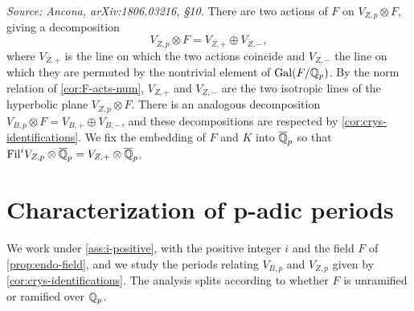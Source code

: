 \begin{remark}
  \label{rem:conventionF}
  \textit{Source: Ancona, arXiv:1806.03216, \S10.}
  There are two actions of \(F\) on \(V_{Z,p} \otimes F\), giving a
  decomposition
  \[V_{Z,p} \otimes F = V_{Z,+} \oplus V_{Z,-},\]
  where \(V_{Z,+}\) is the line on which the two actions coincide and \(V_{Z,-}\)
  the line on which they are permuted by the nontrivial element of
  \(\mathrm{Gal}(F/\mathbb{Q}_p)\). By the norm relation of \cref{cor:F-acts-num}, \(V_{Z,+}\) and \(V_{Z,-}\) are the two
  isotropic lines of the hyperbolic plane \(V_{Z,p} \otimes F\). There is an
  analogous decomposition \(V_{B,p} \otimes F = V_{B,+} \oplus V_{B,-}\), and
  these decompositions are respected by \cref{cor:crys-identifications}. We fix
  the embedding of \(F\) and \(K\) into \(\overline{\mathbb{Q}}_p\) so that
  \(\mathrm{Fil}^i V_{Z,p} \otimes \overline{\mathbb{Q}}_p = V_{Z,+} \otimes \overline{\mathbb{Q}}_p\).
\end{remark}

\section{Characterization of p-adic periods}
\label{sec:padic-periods}

We work under \cref{ass:i-positive}, with the positive integer \(i\) and the
field \(F\) of \cref{prop:endo-field}, and we study the periods relating
\(V_{B,p}\) and \(V_{Z,p}\) given by \cref{cor:crys-identifications}. The
analysis splits according to whether \(F\) is unramified or ramified over
\(\mathbb{Q}_p\).

